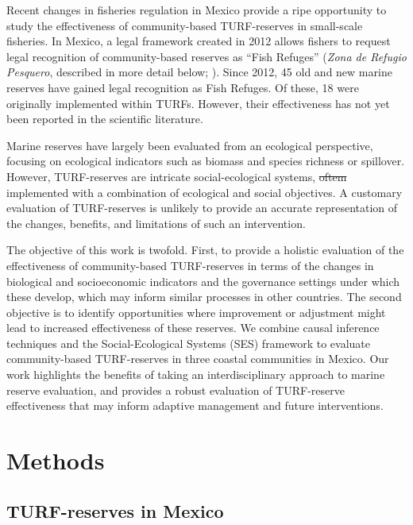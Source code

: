 \documentclass[10pt,letterpaper]{article}
\providecommand{\DIFaddtex}[1]{{\protect\color{blue}\uwave{#1}}} %
\providecommand{\DIFdeltex}[1]{{\protect\color{red}\sout{#1}}}                      %
\providecommand{\DIFaddbegin}{} %
\providecommand{\DIFaddend}{} %
\providecommand{\DIFdelbegin}{} %
\providecommand{\DIFdelend}{} %
\providecommand{\DIFadd}[1]{\texorpdfstring{\DIFaddtex{#1}}{#1}} %
\providecommand{\DIFdel}[1]{\texorpdfstring{\DIFdeltex{#1}}{}} %
\newcommand{\DIFscaledelfig}{0.5}
\newlength{\DIFdelgraphicswidth} %
\newlength{\DIFdelgraphicsheight} %
\newcommand{\DIFaddincludegraphics}[2][]{{\color{blue}\fbox{\DIFOincludegraphics[#1]{#2}}}} %
\newcommand{\DIFdelincludegraphics}[2][]{%
\sbox{\DIFdelgraphicsbox}{\DIFOincludegraphics[#1]{#2}}%
\settoboxwidth{\DIFdelgraphicswidth}{\DIFdelgraphicsbox} %
\settoboxtotalheight{\DIFdelgraphicsheight}{\DIFdelgraphicsbox} %
\scalebox{\DIFscaledelfig}{%
\parbox[b]{\DIFdelgraphicswidth}{\usebox{\DIFdelgraphicsbox}\\[-\baselineskip] \rule{\DIFdelgraphicswidth}{0em}}\llap{\resizebox{\DIFdelgraphicswidth}{\DIFdelgraphicsheight}{%
\setlength{\unitlength}{\DIFdelgraphicswidth}%
\begin{picture}(1,1)%
\thicklines\linethickness{2pt} %
{\color[rgb]{1,0,0}\put(0,0){\framebox(1,1){}}}%
{\color[rgb]{1,0,0}\put(0,0){\line( 1,1){1}}}%
{\color[rgb]{1,0,0}\put(0,1){\line(1,-1){1}}}%
\end{picture}%
}\hspace*{3pt}}} %
} %
\DeclareRobustCommand{\DIFaddbegin}{\DIFOaddbegin \let\includegraphics\DIFaddincludegraphics} %
\DeclareRobustCommand{\DIFaddend}{\DIFOaddend \let\includegraphics\DIFOincludegraphics} %
\DeclareRobustCommand{\DIFdelbegin}{\DIFOdelbegin \let\includegraphics\DIFdelincludegraphics} %
\DeclareRobustCommand{\DIFdelend}{\DIFOaddend \let\includegraphics\DIFOincludegraphics} %
\begin{document}
Recent changes in fisheries regulation in Mexico provide a ripe opportunity to study the effectiveness of community-based TURF-reserves in small-scale fisheries. In Mexico, a legal framework created in 2012 allows fishers to request legal recognition of community-based reserves as “Fish Refuges” (\emph{Zona de Refugio Pesquero}, described in more detail below; \cite{nom}). Since 2012, 45 old and new marine reserves have gained legal recognition as Fish Refuges. Of these, 18 were originally implemented within TURFs. However, their effectiveness has not yet been reported in the scientific literature.

Marine reserves have largely been evaluated from an ecological perspective, focusing on ecological indicators such as biomass and species richness or spillover\cite{halpern_2002,lester_2009,krueck_2017-J1}. However, TURF-reserves are intricate social-ecological systems, \DIFdelbegin \DIFdel{oftem }\DIFdelend \DIFaddbegin \DIFadd{often }\DIFaddend implemented with a combination of ecological and social objectives. A customary evaluation of TURF-reserves is unlikely to provide an accurate representation of the changes, benefits, and limitations of such an intervention.

The objective of this work is twofold. First, to provide a holistic evaluation of the effectiveness of community-based TURF-reserves in terms of the changes in biological and socioeconomic indicators and the governance settings under which these develop, which may inform similar processes in other countries. The second objective is to identify opportunities where improvement or adjustment might lead to increased effectiveness of these reserves. We combine causal inference techniques and the Social-Ecological Systems (SES) framework to evaluate community-based TURF-reserves in three coastal communities in Mexico.  Our work highlights the benefits of taking an interdisciplinary approach to marine reserve evaluation, and provides a robust evaluation of TURF-reserve effectiveness that may inform adaptive management and future interventions.

\section*{Methods}

\subsection*{TURF-reserves in Mexico}
\end{document}
